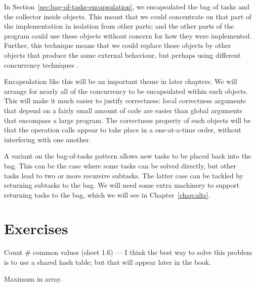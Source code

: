 In Section~\ref{sec:bag-of-tasks-encapsulation}, we encapsulated the bag of
tasks and the collector inside objects.  This meant that we could concentrate
on that part of the implementation in isolation from other parts; and the
other parts of the program could use these objects without concern for how
they were implemented.  Further, this technique means that we could replace
those objects by other objects that produce the same external behaviour, but
perhaps using different concurrency techniques .

Encapsulation like this will be an important theme in later chapters.  We will
arrange for nearly all of the concurrency to be encapsulated within such
objects.  This will make it much easier to justify correctness: local
correctness arguments that depend on a fairly small amount of code are easier
than global arguments that encompass a large program.  The correctness
property of such objects will be that the operation calls appear to take place
in a one-at-a-time order, without interfering with one another.

A variant on the bag-of-tasks pattern allows new tasks to be placed back into
the bag.  This can be the case where some tasks can be solved directly, but
other tasks lead to two or more recursive subtasks.  The latter case can be
tackled by returning subtasks to the bag.  We will need some extra machinery
to support returning tasks to the bag, which we will see in
Chapter~\ref{chap:alts}.





\section*{Exercises}




 Count \# common values (sheet 1.6) --- I think the best way to
solve this problem is to use a shared hash table; but that will appear later
in the book. 

 Maximum in array.




